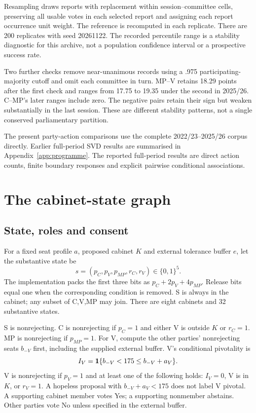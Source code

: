 Resampling draws reports with replacement within session--committee cells, preserving all usable votes in each selected report and assigning each report occurrence unit weight. The reference is recomputed in each replicate. There are 200 replicates with seed 20261122. The recorded percentile range is a stability diagnostic for this archive, not a population confidence interval or a prospective success rate.

Two further checks remove near-unanimous records using a .975 participating-majority cutoff and omit each committee in turn. MP--V retains 18.29 points after the first check and ranges from 17.75 to 19.35 under the second in 2025/26. C--MP's later ranges include zero. The negative pairs retain their sign but weaken substantially in the last session. These are different stability patterns, not a single conserved parliamentary partition.

The present party-action comparisons use the complete 2022/23--2025/26 corpus directly. Earlier full-period SVD results are summarised in Appendix~\ref{app:programme}. The reported full-period results are direct action counts, finite boundary responses and explicit pairwise conditional associations.

\section{The cabinet-state graph}

\subsection{State, roles and consent}

For a fixed seat profile \(a\), proposed cabinet \(K\) and external tolerance buffer \(e\), let the substantive state be
\[
s=(p_C,p_V,p_{MP},r_C,r_V)\in\{0,1\}^5.
\]
The implementation packs the first three bits as \(p_C+2p_V+4p_{MP}\). Release bits equal one when the corresponding condition is removed. S is always in the cabinet; any subset of C,V,MP may join. There are eight cabinets and 32 substantive states.

S is nonrejecting. C is nonrejecting if \(p_C=1\) and either V is outside \(K\) or \(r_C=1\). MP is nonrejecting if \(p_{MP}=1\). For V, compute the other parties' nonrejecting seats \(b_{-V}\) first, including the supplied external buffer. V's conditional pivotality is
\[
I_V=\mathbf{1}\{b_{-V}<175\le b_{-V}+a_V\}.
\]
V is nonrejecting if \(p_V=1\) and at least one of the following holds: \(I_V=0\), V is in \(K\), or \(r_V=1\). A hopeless proposal with \(b_{-V}+a_V<175\) does not label V pivotal. A supporting cabinet member votes Yes; a supporting nonmember abstains. Other parties vote No unless specified in the external buffer.

